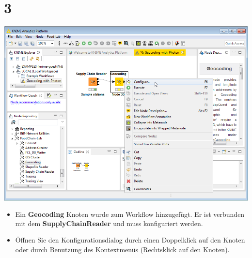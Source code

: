 \documentclass[10pt]{beamer}
\begin{document}
\section{3}
\begin{frame}
	\begin{center}
  		\includegraphics[height=0.6\textheight]{3.png}
	\end{center}
	\begin{itemize}
        \item Ein \textbf{Geocoding} Knoten wurde zum Workflow hinzugefügt. Er ist verbunden mit dem \textbf{SupplyChainReader} und muss konfiguriert werden.
		\item Öffnen Sie den Konfigurationsdialog durch einen Doppelklick auf den Knoten oder durch Benutzung des Kontextmenüs (Rechtsklick auf den Knoten).
	\end{itemize}
\end{frame}
\end{document}
